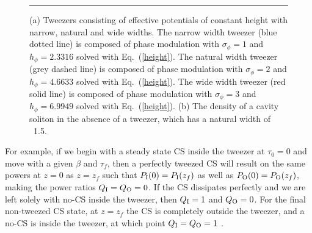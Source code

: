 \begin{figure}[p!]
\centering
{}
  \rule{35em}{0.5pt}
\caption[Tweezers of Narrow, Natural, and Wide Widths]{(a) Tweezers consisting of effective potentials of constant height with narrow, natural and wide widths.  The narrow width tweezer (blue dotted line) is composed of phase modulation with $\sigma_\phi = 1$ and $h_\phi = 2.3316$ solved with Eq.~(\ref{height}).  The natural width tweezer (grey dashed line) is composed of phase modulation with $\sigma_\phi = 2$ and $h_\phi = 4.6633$ solved with Eq.~(\ref{height}).  The wide width tweezer (red solid line) is composed of phase modulation with $\sigma_\phi = 3$ and $h_\phi = 6.9949$ solved with Eq.~(\ref{height}). (b) The density of a cavity soliton in the absence of a tweezer, which has a natural width of ~1.5.  
}
\label{fig:Veff}
\end{figure}


For example, if we begin with a steady state CS inside the tweezer at $\tau_0=0$ and move with a given $\beta$ and $\tau_f$, then a perfectly tweezed CS will result on the same powers at $z=0$ as $z = z_f$ such that $P_{\rm I}(0) =  P_{\rm I}(z_f)$ as well as $P_{\rm O}(0) = P_{\rm O}(z_f)$, making the power ratios $Q_{\rm I} = Q_{\rm O} = 0$.   If the CS dissipates perfectly and we are left solely with no-CS inside the tweezer, then $Q_{\rm I} = 1$ and  $Q_{\rm O} = 0$.  For the final non-tweezed CS state, at $z=z_f$ the CS is completely outside the tweezer, and a no-CS is inside the tweezer, at which point $Q_{\rm I} = Q_{\rm O} = 1$ .   

